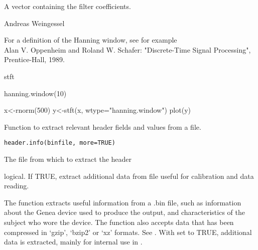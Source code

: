 \documentclass[a4paper]{book}
\begin{document}
%
\begin{Value}
A vector containing the filter coefficients.
\end{Value}
%
\begin{Author}\relax
Andreas Weingessel
\end{Author}
%
\begin{References}\relax
For a definition of the Hanning window, see for example\\{}
Alan V. Oppenheim and Roland W. Schafer: "Discrete-Time Signal
Processing", Prentice-Hall, 1989.
\end{References}
%
\begin{SeeAlso}\relax
stft
\end{SeeAlso}
%
\begin{Examples}
\begin{ExampleCode}
hanning.window(10)

x<-rnorm(500)
y<-stft(x, wtype="hanning.window")
plot(y)
\end{ExampleCode}
\end{Examples}
%
\begin{Description}\relax
Function to extract relevant header fields and values from a file.
\end{Description}
%
\begin{Usage}
\begin{verbatim}
header.info(binfile, more=TRUE)
\end{verbatim}
\end{Usage}
%
\begin{Arguments}
\begin{ldescription}
\item[\code{binfile}] The file from which to extract the header
\item[\code{more}] logical. If TRUE, extract additional data from file useful for calibration and data reading.
\end{ldescription}
\end{Arguments}
%
\begin{Details}\relax
The function extracts useful information from a .bin file, such as information about the Genea device used to produce the output, and characteristics of the subject who wore the device. The function also accepts data that has been compressed in `gzip', `bzip2' or `xz' formats. See .
With  set to TRUE, additional data is extracted, mainly for internal use in .
\end{Details}
\end{document}
